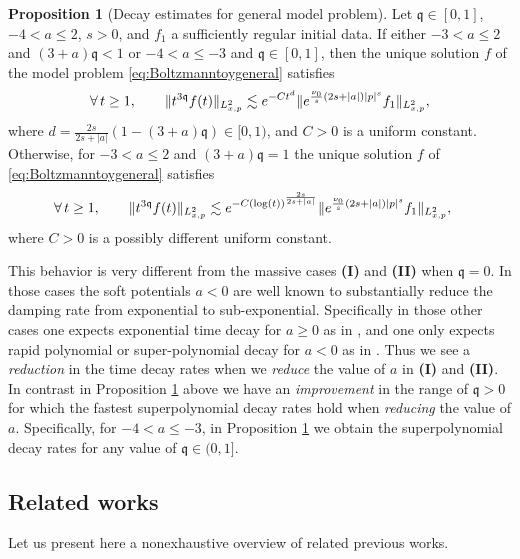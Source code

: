 \documentclass[reqno]{amsart}
\newcommand{\qq}{\mathfrak{q}}
\newcommand{\dr}{d}
\theoremstyle{definition}
\newtheorem{proposition}[theorem]{Proposition}
\numberwithin{equation}{section}
\numberwithin{theorem}{section}
\begin{document}
\begin{proposition}[Decay estimates for general model problem]\label{proplineargeneralmodel}
Let \(\qq \in [0,1]\), \(-4<a\leq 2\), \( s>0 \), and \(f_1\) a sufficiently regular initial data. If either \(-3<a\leq 2\) and  $(3+a)\qq < 1$ or \(-4<a\leq -3\) and \(\qq \in [0,1]\), then the unique solution \(f\) of the model problem \eqref{eq:Boltzmanntoygeneral} satisfies 
\begin{align}\notag 
 \forall \,t\geq 1,\qquad       			\|t^{3\qq} f(t)\|_{L^2_{x,p}}
        \lesssim
		e^{-C t^{\dr}} \| e^{ \frac{{  \nu_0}}{s}(2s +|a|)|p|^s}f_1\|_{L^2_{x,p}},
\end{align}
where \( d  = \frac{2s}{2s+|a|} \left( 1-(3+a)\qq\right) \in [0, 1)\), and $C>0$ is a uniform constant. Otherwise, for \(-3<a\leq 2\) and $(3+a)\qq = 1$ the unique solution \(f\) of \eqref{eq:Boltzmanntoygeneral} satisfies 
\begin{align} \notag
  \forall \,t\geq 1,\qquad      			\|t^{3\qq} f(t)\|_{L^2_{x,p}}
      &  \lesssim
		e^{-C \left(\log (t)\right)^{\frac{2s}{2s +|a|}}} \| e^{  \frac{{ \nu_0}}{s}(2s +|a|)|p|^s}f_1\|_{L^2_{x,p}},
\end{align}
where $C>0$ is a possibly different uniform constant. 
\end{proposition}


This behavior is very different from the  massive cases {\bf (I)} and {\bf (II)} when $\qq=0$.  In those cases the soft potentials $a<0$ are well known to substantially reduce the damping rate from exponential to sub-exponential.  Specifically in those other cases one expects exponential time decay for $a\geq 0$ as in \cite{Ukai-86,MR1211782}, and one only expects rapid polynomial or super-polynomial decay for $a<0$ as in \cite{MR2728733,strain2006almost,MR2366140,Caf1,Ca-1980}. Thus we see a {\it reduction} in the time decay rates when we {\it reduce} the value of $a$ in {\bf (I)} and {\bf (II)}.  In contrast in Proposition \ref{proplineargeneralmodel} above we have an {\it improvement} in the range of $\qq>0$ for which the fastest superpolynomial decay rates hold when {\it reducing} the value of $a$.  Specifically, for $-4<a\leq -3$, in Proposition \ref{proplineargeneralmodel} we obtain the superpolynomial decay rates for any value of $\qq \in(0,1]$. 






\subsection{Related works} 
Let us present here a nonexhaustive overview of related previous works.
\end{document}
